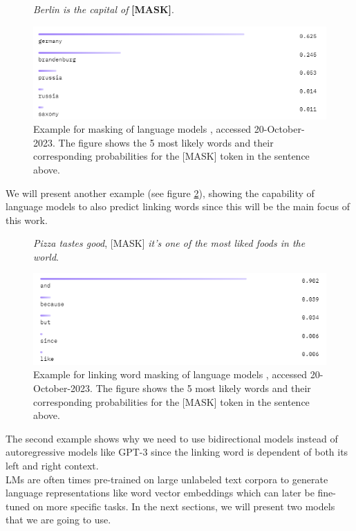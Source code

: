\begin{figure}[H]
  \begin{center}
	\textit{Berlin is the capital of} \textbf{[MASK]}.
  \end{center}
  \centering
  \includegraphics[scale=0.9]{fig/bert_masking_example.png}
  \caption{Example for masking of language models \cite{bertbaseuncased}, accessed 20-October-2023. The figure shows the 5 most likely words and their corresponding probabilities for the [MASK] token in the sentence above.}%
  \label{fig:bert_masking_example}
\end{figure}

We will present another example (see figure \ref{fig:bert_masking_example2}), showing the capability of language models to also predict linking words since this will be the main focus of this work.

\begin{figure}[H]
  \begin{center}
	\textit{Pizza tastes good}, [MASK] \textit{it's one of the most liked foods in the world}.
  \end{center}
  \centering
  \includegraphics[scale=0.9]{fig/bert_masking_example2.png}
  \caption{Example for linking word masking of language models \cite{bertbaseuncased}, accessed 20-October-2023. The figure shows the 5 most likely words and their corresponding probabilities for the [MASK] token in the sentence above.}%
  \label{fig:bert_masking_example2}
\end{figure}

The second example shows why we need to use bidirectional models instead of autoregressive models like GPT-3 since the linking word is dependent of both its left and right context. \\
LMs are often times pre-trained on large unlabeled text corpora to generate language representations like word vector embeddings which can later be fine-tuned on more specific tasks. In the next sections, we will present two models that we are going to use.


